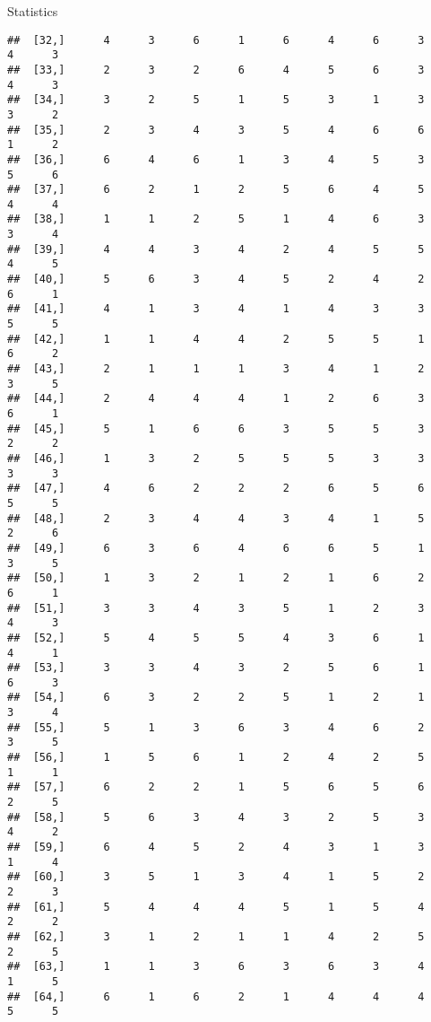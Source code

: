 \documentclass[
  ignorenonframetext,
]{beamer}
\begin{document}
\begin{frame}[fragile]{Statistics}
\begin{verbatim}
##  [32,]      4      3      6      1      6      4      6      3      4      3
##  [33,]      2      3      2      6      4      5      6      3      4      3
##  [34,]      3      2      5      1      5      3      1      3      3      2
##  [35,]      2      3      4      3      5      4      6      6      1      2
##  [36,]      6      4      6      1      3      4      5      3      5      6
##  [37,]      6      2      1      2      5      6      4      5      4      4
##  [38,]      1      1      2      5      1      4      6      3      3      4
##  [39,]      4      4      3      4      2      4      5      5      4      5
##  [40,]      5      6      3      4      5      2      4      2      6      1
##  [41,]      4      1      3      4      1      4      3      3      5      5
##  [42,]      1      1      4      4      2      5      5      1      6      2
##  [43,]      2      1      1      1      3      4      1      2      3      5
##  [44,]      2      4      4      4      1      2      6      3      6      1
##  [45,]      5      1      6      6      3      5      5      3      2      2
##  [46,]      1      3      2      5      5      5      3      3      3      3
##  [47,]      4      6      2      2      2      6      5      6      5      5
##  [48,]      2      3      4      4      3      4      1      5      2      6
##  [49,]      6      3      6      4      6      6      5      1      3      5
##  [50,]      1      3      2      1      2      1      6      2      6      1
##  [51,]      3      3      4      3      5      1      2      3      4      3
##  [52,]      5      4      5      5      4      3      6      1      4      1
##  [53,]      3      3      4      3      2      5      6      1      6      3
##  [54,]      6      3      2      2      5      1      2      1      3      4
##  [55,]      5      1      3      6      3      4      6      2      3      5
##  [56,]      1      5      6      1      2      4      2      5      1      1
##  [57,]      6      2      2      1      5      6      5      6      2      5
##  [58,]      5      6      3      4      3      2      5      3      4      2
##  [59,]      6      4      5      2      4      3      1      3      1      4
##  [60,]      3      5      1      3      4      1      5      2      2      3
##  [61,]      5      4      4      4      5      1      5      4      2      2
##  [62,]      3      1      2      1      1      4      2      5      2      5
##  [63,]      1      1      3      6      3      6      3      4      1      5
##  [64,]      6      1      6      2      1      4      4      4      5      5

\end{verbatim}
\end{frame}
\end{document}
